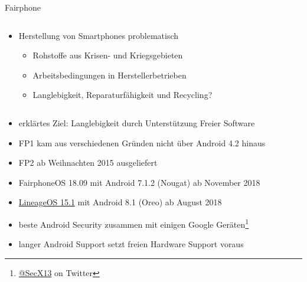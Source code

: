 \documentclass[t]{beamer}
\begin{document}
\begin{frame}{Fairphone}
    \begin{columns}[T]
        \begin{column}{0.77\textwidth}
            \begin{itemize}
                \item Herstellung von Smartphones problematisch
                    \begin{itemize}
                        \item Rohstoffe aus Krisen- und Kriegsgebieten
                        \item Arbeitsbedingungen in Herstellerbetrieben
                        \item Langlebigkeit, Reparaturfähigkeit und
                            Recycling?
                    \end{itemize}
            \end{itemize}
        \end{column}
        \begin{column}{0.2\textwidth}
        \end{column}
    \end{columns}
    \begin{itemize}
        \item erklärtes Ziel: Langlebigkeit durch Unterstützung Freier
            Software
        \item FP1 kam aus verschiedenen Gründen nicht über Android 4.2
            hinaus
        \item FP2 ab Weihnachten 2015 ausgeliefert
        \item FairphoneOS 18.09 mit Android 7.1.2 (Nougat) ab November
            2018
        \item \href{https://wiki.lineageos.org/devices/FP2}{LineageOS 15.1}
            mit Android 8.1 (Oreo) ab August 2018
        \item beste Android Security zusammen mit einigen Google
            Geräten\footnote{\href{https://twitter.com/SecX13/status/1115380640298487808}{@SecX13} on Twitter}
        \item langer Android Support setzt freien Hardware Support
            voraus
    \end{itemize}
\end{frame}
\end{document}
